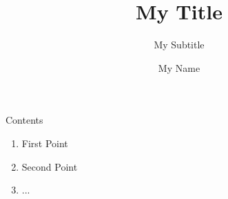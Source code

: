 \documentclass{beamer}
\title{My Title}
\subtitle{My Subtitle}
\author{My Name}
\date{}
\institute{Reference}
\begin{document}
\begin{frame}
\titlepage\thispagestyle{empty}
\end{frame}
\begin{frame}[t]{Contents}\vspace{3pt}
\begin{enumerate}
\item First Point
\item Second Point
\item ...
\end{enumerate}
\end{frame}
\end{document}
